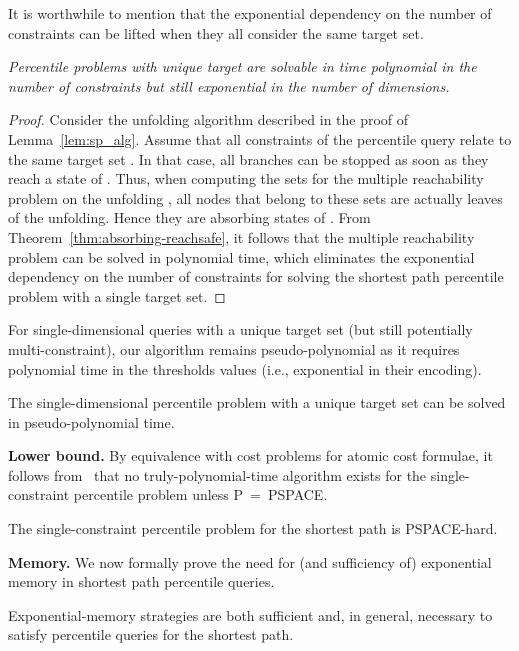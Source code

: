 \documentclass{llncs}
\newcommand\PTIME{\textrm{\sf P}}
\newcommand\PSPACE{\textrm{\sf PSPACE}}
\begin{document}
It is worthwhile to mention that the exponential dependency on the number of constraints can be lifted when they all consider the same target set.

\begin{remark}
\textit{Percentile problems with unique target are solvable in time polynomial in the number of constraints but still exponential in the number of dimensions.}
\end{remark}

\begin{proof}
Consider the unfolding algorithm described in the proof of Lemma~\ref{lem:sp_alg}. Assume that all constraints of the percentile query relate to the same target set . In that case, all branches can be stopped as soon as they reach a state of . Thus, when computing the sets  for the multiple reachability problem on the unfolding , all nodes that belong to these sets are actually leaves of the unfolding. Hence they are absorbing states of . From Theorem~\ref{thm:absorbing-reachsafe}, it follows that the multiple reachability problem can be solved in polynomial time, which eliminates the exponential dependency on the number of constraints for solving the shortest path percentile problem with a single target set.
\end{proof}


For single-dimensional queries with a unique target set (but still potentially multi-constraint), our algorithm remains pseudo-polynomial as it requires polynomial time in the thresholds values (i.e., exponential in their encoding).
\begin{corollary}
\label{cor:sp_alg}
The single-dimensional percentile problem with a unique target set can be solved in pseudo-polynomial time.
\end{corollary}


\noindent\textbf{Lower bound.}
By equivalence with cost problems for atomic cost formulae, it follows
from~\cite[Theorem 7]{HaaseK14} that no truly-polynomial-time algorithm
exists for the single-constraint percentile problem unless \PTIME~=~\PSPACE.

\begin{lemma}
The single-constraint percentile problem for the shortest path is \PSPACE-hard.
\end{lemma}

\smallskip\noindent\textbf{Memory.} 
We now formally prove the need for (and sufficiency of) exponential memory in shortest path percentile queries.

\begin{lemma}
\label{lem:spmemory}
Exponential-memory strategies are both sufficient and, in general, necessary to satisfy percentile queries for the shortest path.
\end{lemma}
\end{document}

